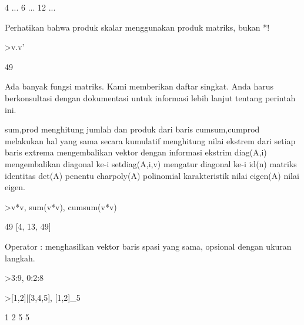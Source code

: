 \documentclass[a4paper,10pt]{article}
\begin{document}
\begin{eulernotebook}
\begin{eulercomment}
\begin{eulercomment}
\begin{eulercomment}
\begin{eulercomment}
\begin{euleroutput}
                        4     ...
                        6     ...
                       12     ...
\end{euleroutput}
\begin{eulercomment}
Perhatikan bahwa produk skalar menggunakan produk matriks, bukan *!
\end{eulercomment}
\begin{eulerprompt}
>v.v'
\end{eulerprompt}
\begin{euleroutput}
  49
\end{euleroutput}
\begin{eulercomment}
Ada banyak fungsi matriks. Kami memberikan daftar singkat. Anda harus
berkonsultasi dengan dokumentasi untuk informasi lebih lanjut tentang
perintah ini.

\end{eulercomment}
\begin{eulerttcomment}
 sum,prod menghitung jumlah dan produk dari baris 
 cumsum,cumprod melakukan hal yang sama secara kumulatif 
 menghitung nilai ekstrem dari setiap baris 
 extrema mengembalikan vektor dengan informasi ekstrim 
 diag(A,i) mengembalikan diagonal ke-i 
 setdiag(A,i,v) mengatur diagonal  ke-i 
 id(n) matriks identitas 
 det(A) penentu 
 charpoly(A) polinomial  karakteristik 
 nilai eigen(A) nilai eigen.
\end{eulerttcomment}
\begin{eulerprompt}
>v*v, sum(v*v), cumsum(v*v)
\end{eulerprompt}
\begin{euleroutput}
  [4,  9,  36]
  49
  [4,  13,  49]
\end{euleroutput}
\begin{eulercomment}
Operator : menghasilkan vektor baris spasi yang sama, opsional dengan
ukuran langkah.
\end{eulercomment}
\begin{eulerprompt}
>3:9, 0:2:8
\end{eulerprompt}
\begin{euleroutput}
  [3,  4,  5,  6,  7,  8,  9]
  [0,  2,  4,  6,  8]
\end{euleroutput}
\begin{eulerprompt}
>[1,2]|[3,4,5], [1,2]_5
\end{eulerprompt}
\begin{euleroutput}
  [1,  2,  3,  4,  5]
                        1                       2 
                        5                       5 
\end{euleroutput}

\end{eulercomment}
\end{eulercomment}
\end{eulercomment}
\end{eulercomment}
\end{eulernotebook}
\end{document}
